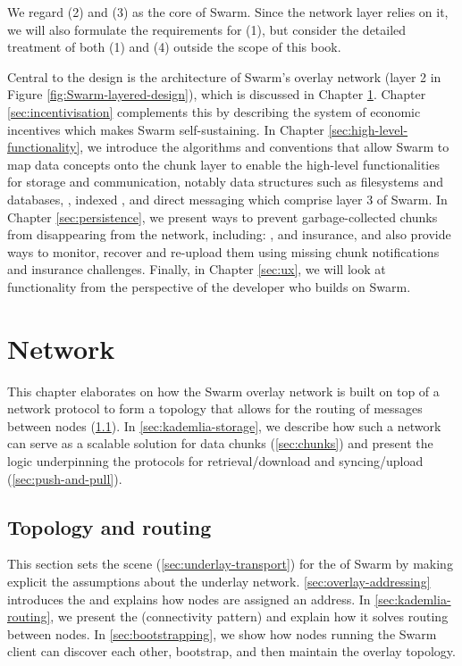 We regard (2) and (3) as the core of Swarm. Since the network layer relies on it, we will also formulate the requirements for (1), but consider the detailed treatment of both (1) and (4) outside the scope of this book.


Central to the design is the architecture of Swarm's overlay network (layer 2 in Figure \ref{fig:Swarm-layered-design}), which is discussed in Chapter \ref{sec:network}. Chapter \ref{sec:incentivisation} complements this by describing the system of economic incentives which makes Swarm self-sustaining. In Chapter \ref{sec:high-level-functionality}, we introduce the algorithms and conventions that allow Swarm to map data concepts onto the chunk layer to enable the high-level functionalities for storage and communication, notably data structures such as filesystems and databases, , indexed , and direct messaging which comprise layer 3 of Swarm.
In Chapter \ref{sec:persistence}, we present ways to prevent garbage-collected chunks from disappearing from the network, including: ,  and insurance, and also provide ways to monitor, recover and re-upload them using missing chunk notifications and insurance challenges. 
Finally, in Chapter \ref{sec:ux}, we will look at functionality from the perspective of the developer who builds on Swarm.

\chapter{Network}\label{sec:network}

This chapter elaborates on how the Swarm overlay network is built on top of a  network protocol to form a topology that allows for the routing of messages between nodes (\ref{sec:topology-routing}). In \ref{sec:kademlia-storage}, we describe how such a network can serve as a scalable  solution for data chunks (\ref{sec:chunks}) and present the logic underpinning the protocols for retrieval/download and syncing/upload (\ref{sec:push-and-pull}).

\section{Topology and routing \statusgreen}\label{sec:topology-routing}

This section sets the scene (\ref{sec:underlay-transport}) for the  of Swarm by making explicit the assumptions about the underlay network. \ref{sec:overlay-addressing} introduces the  and explains how nodes are assigned an address. In  \ref{sec:kademlia-routing}, we present the   (connectivity pattern) and explain how it solves routing between nodes. In \ref{sec:bootstrapping}, we show how nodes running the Swarm client can discover each other, bootstrap, and then maintain the overlay topology.


